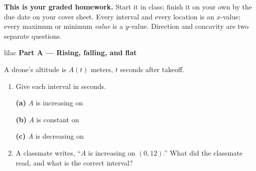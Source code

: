 \documentclass[10pt]{article}
\begin{document}

\vspace{0.12in}

\boxguard[8]
\begin{remindbox}
\small
\textbf{This is your graded homework.} Start it in class; finish it on your own by the due
date on your cover sheet. Every interval and every location is an $x$-value; every maximum or
minimum \emph{value} is a $y$-value. Direction and concavity are two separate questions.
\end{remindbox}

\vspace{0.12in}

\begin{headlinebox}{lilac}
\textbf{\color{plum}Part A --- Rising, falling, and flat}
\end{headlinebox}

\vspace{0.06in}

\noindent\begin{minipage}[t]{0.40\linewidth}
\vspace{0pt}
\centering
{}
\end{minipage}\hfill
\begin{minipage}[t]{0.57\linewidth}
\vspace{0pt}
A drone's altitude is $A(t)$ meters, $t$ seconds after takeoff.
\begin{enumerate}[leftmargin=1.9em, itemsep=8pt]
\item Give each interval in seconds.

      \textbf{(a)} $A$ is increasing on \hfill \blank{2.2cm}

      \textbf{(b)} $A$ is constant on \hfill \blank{2.2cm}

      \textbf{(c)} $A$ is decreasing on \hfill \blank{2.2cm}

\item A classmate writes, ``$A$ is increasing on $(0, 12)$.'' What did the classmate read,
      and what is the correct interval?
      \writespace{1.3cm}{}
\end{enumerate}
\end{minipage}
\end{document}
